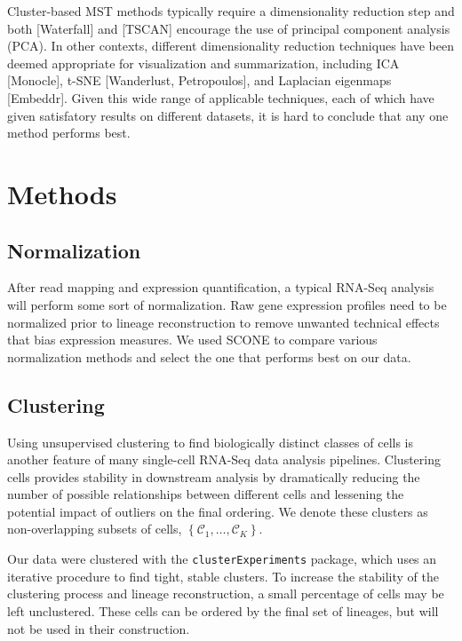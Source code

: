 \documentclass[11pt]{article}\usepackage[]{graphicx}\usepackage[]{color}
\begin{document}
Cluster-based MST methods typically require a dimensionality reduction step and both [Waterfall] and [TSCAN] encourage the use of principal component analysis (PCA). In other contexts, different dimensionality reduction techniques have been deemed appropriate for visualization and summarization, including ICA [Monocle], t-SNE [Wanderlust, Petropoulos], and Laplacian eigenmaps [Embeddr]. Given this wide range of applicable techniques, each of which have given satisfatory results on different datasets, it is hard to conclude that any one method performs best.








\section{Methods}

\subsection{Normalization}
After read mapping and expression quantification, a typical RNA-Seq analysis will perform some sort of normalization. Raw gene expression profiles need to be normalized prior to lineage reconstruction to remove unwanted technical effects that bias expression measures. We used SCONE to compare various normalization methods and select the one that performs best on our data.

\subsection{Clustering}
Using unsupervised clustering to find biologically distinct classes of cells is another feature of many single-cell RNA-Seq data analysis pipelines. Clustering cells provides stability in downstream analysis by dramatically reducing the number of possible relationships between different cells and lessening the potential impact of outliers on the final ordering. We denote these clusters as non-overlapping subsets of cells, $\left\{\mathcal{C}_1,\dots,\mathcal{C}_K\right\}$.

Our data were clustered with the \texttt{clusterExperiments} package, which uses an iterative procedure to find tight, stable clusters. To increase the stability of the clustering process and lineage reconstruction, a small percentage of cells may be left unclustered. These cells can be ordered by the final set of lineages, but will not be used in their construction.
\end{document}
